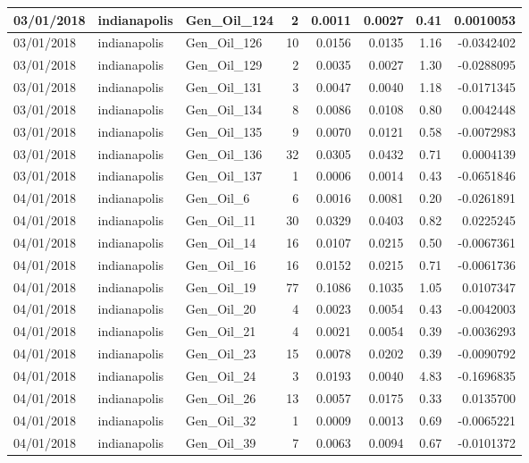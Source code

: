 \documentclass[
  letterpaper,
  DIV=11,
  numbers=noendperiod]{scrartcl}
\begin{document}
\begin{tabular}{l|l|l|r|r|r|r|r}
\hline
03/01/2018 & indianapolis & Gen\_Oil\_124 & 2 & 0.0011 & 0.0027 & 0.41 & 0.0010053\\
\hline
03/01/2018 & indianapolis & Gen\_Oil\_126 & 10 & 0.0156 & 0.0135 & 1.16 & -0.0342402\\
\hline
03/01/2018 & indianapolis & Gen\_Oil\_129 & 2 & 0.0035 & 0.0027 & 1.30 & -0.0288095\\
\hline
03/01/2018 & indianapolis & Gen\_Oil\_131 & 3 & 0.0047 & 0.0040 & 1.18 & -0.0171345\\
\hline
03/01/2018 & indianapolis & Gen\_Oil\_134 & 8 & 0.0086 & 0.0108 & 0.80 & 0.0042448\\
\hline
03/01/2018 & indianapolis & Gen\_Oil\_135 & 9 & 0.0070 & 0.0121 & 0.58 & -0.0072983\\
\hline
03/01/2018 & indianapolis & Gen\_Oil\_136 & 32 & 0.0305 & 0.0432 & 0.71 & 0.0004139\\
\hline
03/01/2018 & indianapolis & Gen\_Oil\_137 & 1 & 0.0006 & 0.0014 & 0.43 & -0.0651846\\
\hline
04/01/2018 & indianapolis & Gen\_Oil\_6 & 6 & 0.0016 & 0.0081 & 0.20 & -0.0261891\\
\hline
04/01/2018 & indianapolis & Gen\_Oil\_11 & 30 & 0.0329 & 0.0403 & 0.82 & 0.0225245\\
\hline
04/01/2018 & indianapolis & Gen\_Oil\_14 & 16 & 0.0107 & 0.0215 & 0.50 & -0.0067361\\
\hline
04/01/2018 & indianapolis & Gen\_Oil\_16 & 16 & 0.0152 & 0.0215 & 0.71 & -0.0061736\\
\hline
04/01/2018 & indianapolis & Gen\_Oil\_19 & 77 & 0.1086 & 0.1035 & 1.05 & 0.0107347\\
\hline
04/01/2018 & indianapolis & Gen\_Oil\_20 & 4 & 0.0023 & 0.0054 & 0.43 & -0.0042003\\
\hline
04/01/2018 & indianapolis & Gen\_Oil\_21 & 4 & 0.0021 & 0.0054 & 0.39 & -0.0036293\\
\hline
04/01/2018 & indianapolis & Gen\_Oil\_23 & 15 & 0.0078 & 0.0202 & 0.39 & -0.0090792\\
\hline
04/01/2018 & indianapolis & Gen\_Oil\_24 & 3 & 0.0193 & 0.0040 & 4.83 & -0.1696835\\
\hline
04/01/2018 & indianapolis & Gen\_Oil\_26 & 13 & 0.0057 & 0.0175 & 0.33 & 0.0135700\\
\hline
04/01/2018 & indianapolis & Gen\_Oil\_32 & 1 & 0.0009 & 0.0013 & 0.69 & -0.0065221\\
\hline
04/01/2018 & indianapolis & Gen\_Oil\_39 & 7 & 0.0063 & 0.0094 & 0.67 & -0.0101372\\

\end{tabular}
\end{document}
